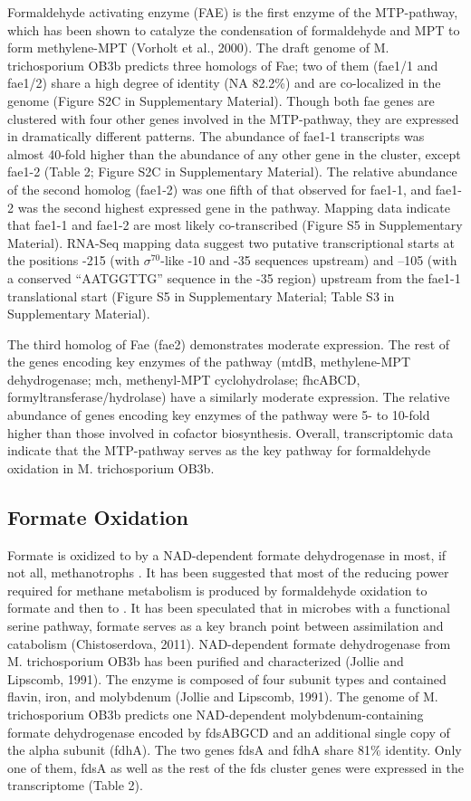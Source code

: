 Formaldehyde activating enzyme (FAE) is the first enzyme of the MTP-pathway, which has been shown to catalyze the condensation of formaldehyde and MPT to form methylene-MPT (Vorholt et al., 2000).
The draft genome of M. trichosporium OB3b predicts three homologs of Fae; two of them (fae1/1 and fae1/2) share a high degree of identity (NA 82.2\%) and are co-localized in the genome (Figure S2C in Supplementary Material).
Though both fae genes are clustered with four other genes involved in the MTP-pathway, they are expressed in dramatically different patterns.
The abundance of fae1-1 transcripts was almost 40-fold higher than the abundance of any other gene in the cluster, except fae1-2 (Table 2; Figure S2C in Supplementary Material).
The relative abundance of the second homolog (fae1-2) was one fifth of that observed for fae1-1, and fae1-2 was the second highest expressed gene in the pathway.
Mapping data indicate that fae1-1 and fae1-2 are most likely co-transcribed (Figure S5 in Supplementary Material).
RNA-Seq mapping data suggest two putative transcriptional starts at the positions -215 (with $\sigma^{70}$-like -10 and -35 sequences upstream) and –105 (with a conserved “AATGGTTG” sequence in the -35 region) upstream from the fae1-1 translational start (Figure S5 in Supplementary Material; Table S3 in Supplementary Material).

The third homolog of Fae (fae2) demonstrates moderate expression.
The rest of the genes encoding key enzymes of the pathway (mtdB, methylene-MPT dehydrogenase; mch, methenyl-MPT cyclohydrolase; fhcABCD, formyltransferase/hydrolase) have a similarly moderate expression.
The relative abundance of genes encoding key enzymes of the pathway were 5- to 10-fold higher than those involved in cofactor biosynthesis.
Overall, transcriptomic data indicate that the MTP-pathway serves as the key pathway for formaldehyde oxidation in M. trichosporium OB3b.

\subsection{Formate Oxidation}
Formate is oxidized to  by a NAD-dependent formate dehydrogenase in most, if not all, methanotrophs \cite{anthony1982}.
It has been suggested that most of the reducing power required for methane metabolism is produced by formaldehyde oxidation to formate and then to  \cite{hanson1996}.
It has been speculated that in microbes with a functional serine pathway, formate serves as a key branch point between assimilation and catabolism (Chistoserdova, 2011).
NAD-dependent formate dehydrogenase from M. trichosporium OB3b has been purified and characterized (Jollie and Lipscomb, 1991).
The enzyme is composed of four subunit types and contained flavin, iron, and molybdenum (Jollie and Lipscomb, 1991).
The genome of M. trichosporium OB3b predicts one NAD-dependent molybdenum-containing formate dehydrogenase encoded by fdsABGCD and an additional single copy of the alpha subunit (fdhA).
The two genes fdsA and fdhA share 81\% identity.
Only one of them, fdsA as well as the rest of the fds cluster genes were expressed in the transcriptome (Table 2).

